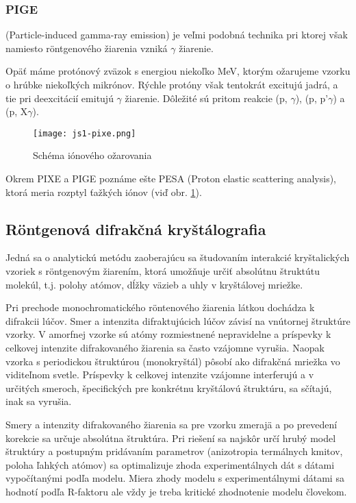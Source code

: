 \documentclass[../../main.tex]{subfiles}
\begin{document}
\subsubsection{PIGE} (Particle-induced gamma-ray emission) je veľmi podobná technika pri ktorej však namiesto r\"{o}ntgenového žiarenia vzniká $\gamma$ žiarenie. 

Opäť máme protónový zväzok s energiou niekoľko MeV, ktorým ožarujeme vzorku o hrúbke niekoľkých mikrónov. Rýchle protóny však tentokrát excitujú jadrá, a tie pri deexcitácií emitujú $\gamma$ žiarenie. Dôležité sú pritom reakcie (p, $\gamma$), (p, p'$\gamma$) a (p, X$\gamma$).

\begin{figure}[h]
\centering
\texttt{[image: js1-pixe.png]}
\caption{Schéma iónového ožarovania}
\label{js1:img:pixe}
\end{figure}

Okrem PIXE a PIGE poznáme ešte PESA (Proton elastic scattering analysis), ktorá meria rozptyl ťažkých iónov (viď obr. \ref{js1:img:pixe}).

\subsection{R\"{o}ntgenová difrakčná kryštálografia}

Jedná sa o analytickú metódu zaoberajúcu sa študovaním interakcié kryštalických vzoriek s r\"{o}ntgenovým žiarením, ktorá umožňuje určiť absolútnu štruktútu molekúl, t.j. polohy atómov, dĺžky väzieb a uhly v kryštálovej mriežke.

Pri prechode monochromatického r\"{o}ntenového žiarenia látkou dochádza k difrakcii lúčov. Smer a intenzita difraktujúcich lúčov závisí na vnútornej štruktúre vzorky. V amorfnej vzorke sú atómy rozmiestnené nepravidelne a príspevky k celkovej intenzite difrakovaného žiarenia sa často vzájomne vyrušia. Naopak vzorka s periodickou štruktúrou (monokryštál) pôsobí ako difrakčná mriežka vo viditeľnom svetle. Príspevky k celkovej intenzite vzájomne interferujú a v určitých smeroch, špecifických pre konkrétnu kryštálovú štruktúru, sa sčítajú, inak sa vyrušia.

Smery a intenzity difrakovaného žiarenia sa pre vzorku zmerajä a po prevedení korekcie sa určuje absolútna štruktúra. Pri riešení sa najskôr určí hrubý model štruktúry a postupným pridávaním parametrov (anizotropia termálnych kmitov, poloha ľahkých atómov) sa optimalizuje zhoda experimentálnych dát s dátami vypočítanými podľa modelu. Miera zhody modelu s experimentálnymi dátami sa hodnotí podľa R-faktoru ale vždy je treba kritické zhodnotenie modelu človekom.
\end{document}
